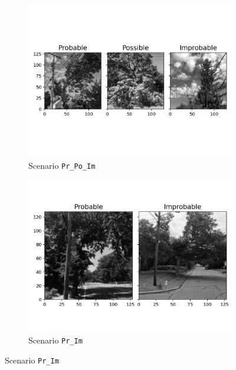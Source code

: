 \documentclass[Journal,letterpaper, SingleSpace, InsideFigs]{ascelike-new}
\begin{document}
\begin{figure}[h!]
  \centering
  \begin{subfigure}[t]{.75\linewidth}
    \centering
    \includegraphics[width=.8\linewidth, trim={0 3cm 0 3cm}, clip]{processed_input_images_Pr_Po_Im_128_px}
    \caption{Scenario \texttt{Pr\_Po\_Im}}
    \label{pr_po_im_64}
  \end{subfigure}%
  
  \begin{subfigure}[t]{.5\linewidth}
    \centering
    \includegraphics[width=\linewidth, trim={0 3cm 0 2cm}, clip]{processed_input_images_Pr_Im_128_px}
    \caption{Scenario \texttt{Pr\_Im}}
    \label{pr_im_64}
  \end{subfigure}%
  

\end{figure}
\end{document}
